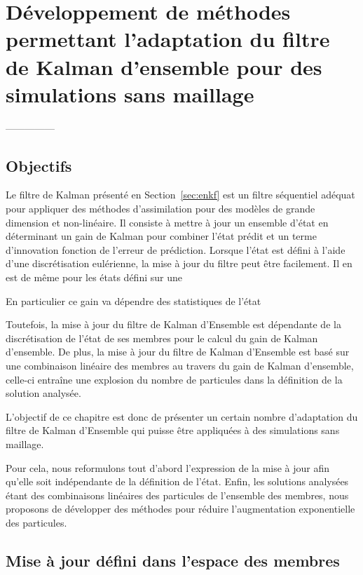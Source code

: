 \chapter{Développement de méthodes permettant l'adaptation du filtre de Kalman d'ensemble pour des simulations sans maillage}

---------------
\section{Objectifs}
Le filtre de Kalman présenté en Section~\ref*{sec:enkf} est un filtre séquentiel adéquat pour appliquer des méthodes d'assimilation pour des modèles de grande dimension et non-linéaire. Il consiste à mettre à jour un ensemble d'état en déterminant un gain de Kalman pour combiner l'état prédit et un terme d'innovation fonction de l'erreur de prédiction. Lorsque l'état est défini à l'aide d'une discrétisation eulérienne, la mise à jour du filtre peut être facilement. Il en est de même pour les états défini sur une

%
%

En particulier ce gain va dépendre des statistiques de l'état

Toutefois, la mise à jour du filtre de Kalman d'Ensemble est dépendante de la discrétisation de l'état de ses membres pour le calcul du gain de Kalman d'ensemble. De plus, la mise à jour du filtre de Kalman d'Ensemble est basé sur une combinaison linéaire des membres au travers du gain de Kalman d'ensemble, celle-ci entraîne une explosion du nombre de particules dans la définition de la solution analysée.

L'objectif de ce chapitre est donc de présenter un certain nombre d'adaptation du filtre de Kalman d'Ensemble qui puisse être appliquées à des simulations sans maillage.

Pour cela, nous reformulons tout d'abord l'expression de la mise à jour afin qu'elle soit indépendante de la définition de l'état.
Enfin, les solutions analysées étant des combinaisons linéaires des particules de l'ensemble des membres, nous proposons de développer des méthodes pour réduire l'augmentation exponentielle des particules.

\section{Mise à jour défini dans l'espace des membres}~\label{sec:enkf_membre}

